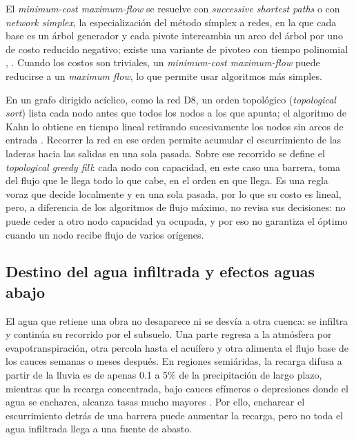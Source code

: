 El \emph{minimum-cost maximum-flow} se resuelve con \emph{successive shortest paths} o con \emph{network simplex}, la especialización del método símplex a redes, en la que cada base es un árbol generador y cada pivote intercambia un arco del árbol por uno de costo reducido negativo; existe una variante de pivoteo con tiempo polinomial , . Cuando los costos son triviales, un \emph{minimum-cost maximum-flow} puede reducirse a un \emph{maximum flow}, lo que permite usar algoritmos más simples.

En un grafo dirigido acíclico, como la red D8, un orden topológico (\emph{topological sort}) lista cada nodo antes que todos los nodos a los que apunta; el algoritmo de Kahn lo obtiene en tiempo lineal retirando sucesivamente los nodos sin arcos de entrada . Recorrer la red en ese orden permite acumular el escurrimiento de las laderas hacia las salidas en una sola pasada. Sobre ese recorrido se define el \emph{topological greedy fill}: cada nodo con capacidad, en este caso una barrera, toma del flujo que le llega todo lo que cabe, en el orden en que llega. Es una regla voraz que decide localmente y en una sola pasada, por lo que su costo es lineal, pero, a diferencia de los algoritmos de flujo máximo, no revisa sus decisiones: no puede ceder a otro nodo capacidad ya ocupada, y por eso no garantiza el óptimo cuando un nodo recibe flujo de varios orígenes.


\subsection{Destino del agua infiltrada y efectos aguas abajo}

El agua que retiene una obra no desaparece ni se desvía a otra cuenca: se infiltra y continúa su recorrido por el subsuelo. Una parte regresa a la atmósfera por evapotranspiración, otra percola hasta el acuífero y otra alimenta el flujo base de los cauces semanas o meses después. En regiones semiáridas, la recarga difusa a partir de la lluvia es de apenas 0.1 a 5\% de la precipitación de largo plazo, mientras que la recarga concentrada, bajo cauces efímeros o depresiones donde el agua se encharca, alcanza tasas mucho mayores . Por ello, encharcar el escurrimiento detrás de una barrera puede aumentar la recarga, pero no toda el agua infiltrada llega a una fuente de abasto.

